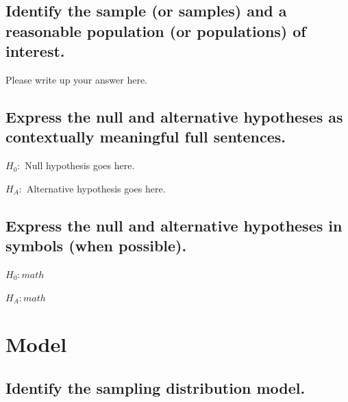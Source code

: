 \documentclass[
]{book}
\begin{document}
\hypertarget{identify-the-sample-or-samples-and-a-reasonable-population-or-populations-of-interest.-3}{%
\subsection*{Identify the sample (or samples) and a reasonable population (or populations) of interest.}\label{identify-the-sample-or-samples-and-a-reasonable-population-or-populations-of-interest.-3}}

Please write up your answer here.

\hypertarget{express-the-null-and-alternative-hypotheses-as-contextually-meaningful-full-sentences.-3}{%
\subsection*{Express the null and alternative hypotheses as contextually meaningful full sentences.}\label{express-the-null-and-alternative-hypotheses-as-contextually-meaningful-full-sentences.-3}}

\(H_{0}:\) Null hypothesis goes here.

\(H_{A}:\) Alternative hypothesis goes here.

\hypertarget{express-the-null-and-alternative-hypotheses-in-symbols-when-possible.-3}{%
\subsection*{Express the null and alternative hypotheses in symbols (when possible).}\label{express-the-null-and-alternative-hypotheses-in-symbols-when-possible.-3}}

\(H_{0}: math\)

\(H_{A}: math\)

\hypertarget{model-3}{%
\section*{Model}\label{model-3}}

\hypertarget{identify-the-sampling-distribution-model.-3}{%
\subsection*{Identify the sampling distribution model.}\label{identify-the-sampling-distribution-model.-3}}
\end{document}
